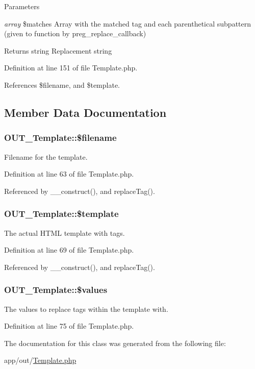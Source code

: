 \begin{DoxyParams}{Parameters}
\item[{\em array}]\$matches Array with the matched tag and each parenthetical subpattern (given to function by preg\_\-replace\_\-callback)\end{DoxyParams}
\begin{DoxyReturn}{Returns}
string Replacement string 
\end{DoxyReturn}


Definition at line 151 of file Template.php.

References \$filename, and \$template.

\subsection{Member Data Documentation}
\hypertarget{classOUT__Template_a296bfcd3d6b713859bd81c827d87aa3e}{
\subsubsection[{\$filename}]{\setlength{\rightskip}{0pt plus 5cm}OUT\_\-Template::\$filename}}
\label{d0/dcf/classOUT__Template_a296bfcd3d6b713859bd81c827d87aa3e}
Filename for the template. 

Definition at line 63 of file Template.php.

Referenced by \_\-\_\-construct(), and replaceTag().\hypertarget{classOUT__Template_a1c04c575b35949f8146c1a5eef5c2ed7}{
\subsubsection[{\$template}]{\setlength{\rightskip}{0pt plus 5cm}OUT\_\-Template::\$template}}
\label{d0/dcf/classOUT__Template_a1c04c575b35949f8146c1a5eef5c2ed7}
The actual HTML template with tags. 

Definition at line 69 of file Template.php.

Referenced by \_\-\_\-construct(), and replaceTag().\hypertarget{classOUT__Template_a60c326b6e906fce16b17436540625a66}{
\subsubsection[{\$values}]{\setlength{\rightskip}{0pt plus 5cm}OUT\_\-Template::\$values}}
\label{d0/dcf/classOUT__Template_a60c326b6e906fce16b17436540625a66}
The values to replace tags within the template with. 

Definition at line 75 of file Template.php.

The documentation for this class was generated from the following file:\begin{DoxyCompactItemize}
\item 
app/out/\hyperlink{Template_8php}{Template.php}\end{DoxyCompactItemize}
